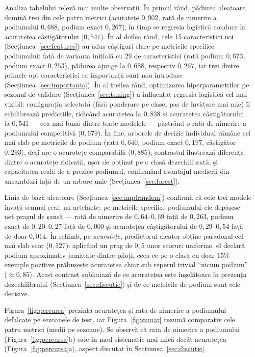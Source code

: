 \documentclass[12pt,a4paper]{report}
\begin{document}
Analiza tabelului relevă mai multe observații. În primul rând, pădurea aleatoare domină trei din
cele patru metrici (acuratețe $0{,}902$, rată de nimerire a podiumului $0{,}688$, podium exact
$0{,}267$), în timp ce regresia logistică conduce la acuratețea câștigătorului ($0{,}541$). În al
doilea rând, cele 15 caracteristici noi (Secțiunea~\ref{sec:features}) au adus câștiguri clare pe
metricile specifice podiumului: față de varianta inițială cu 29 de caracteristici (rată podium
$0{,}673$, podium exact $0{,}253$), pădurea ajunge la $0{,}688$, respectiv $0{,}267$, iar trei
dintre primele opt caracteristici ca importanță sunt nou introduse (Secțiunea~\ref{sec:importanta}).
În al treilea rând, optimizarea hiperparametrilor pe sezonul de validare
(Secțiunea~\ref{sec:tuning}) a influențat regresia logistică cel mai vizibil: configurația
selectată (fără ponderare pe clase, pas de învățare mai mic) îi echilibrează predicțiile, ridicând
acuratețea la $0{,}838$ și acuratețea câștigătorului la $0{,}541$ --- cea mai bună dintre toate
modelele --- păstrând o rată de nimerire a podiumului competitivă ($0{,}679$). În fine, arborele de
decizie individual rămâne cel mai slab pe metricile de podium (rată $0{,}640$, podium exact
$0{,}197$, câștigător $0{,}293$), deși are o acuratețe comparabilă ($0{,}885$); contrastul ilustrează
diferența dintre o acuratețe ridicată, ușor de obținut pe o clasă dezechilibrată, și capacitatea
reală de a prezice podiumul, confirmând avantajul medierii din ansambluri față de un arbore unic
(Secțiunea~\ref{sec:forest}).

Linia de bază aleatoare (Secțiunea~\ref{sec:implrandom}) confirmă că cele trei modele învață semnal
real, nu artefacte: pe metricile specifice podiumului ele depășesc net pragul de șansă --- rată de
nimerire de $0{,}64$--$0{,}69$ față de $0{,}263$, podium exact de $0{,}20$--$0{,}27$ față de
$0{,}000$ și acuratețea câștigătorului de $0{,}29$--$0{,}54$ față de doar $0{,}014$. În schimb, pe
\emph{acuratețe}, predictorul aleator obține paradoxal cel mai slab scor ($0{,}527$): aplicând un
prag de $0{,}5$ unor scoruri uniforme, el declară podium aproximativ jumătate dintre piloți, ceea ce
pe o clasă cu doar 15\% exemple pozitive prăbușește acuratețea chiar sub reperul trivial ``niciun
podium'' ($\approx 0{,}85$). Acest contrast subliniază de ce acuratețea este înșelătoare în prezența
dezechilibrului (Secțiunea~\ref{sec:discutie}) și de ce metricile de podium sunt cele decisive.

Figura~\ref{fig:percursa} prezintă acuratețea și rata de nimerire a podiumului defalcate pe
sezoanele de test, iar Figura~\ref{fig:sumar} rezumă comparativ cele patru metrici (medii pe
sezoane). Se observă că rata de nimerire a podiumului (Figura~\ref{fig:percursa}b) este în mod
sistematic mai mică decât acuratețea (Figura~\ref{fig:percursa}a), aspect discutat în
Secțiunea~\ref{sec:discutie}.
\end{document}
